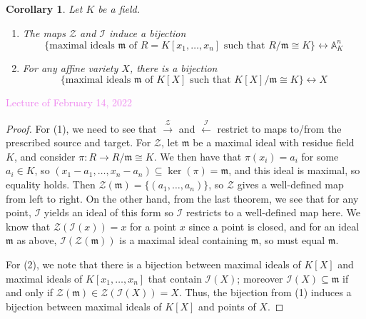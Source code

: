 \documentclass{amsart}[12pt]
\def\ker{\operatorname{ker}}
\newcommand{\Feb}[1]{\textcolor{violet}{Lecture of February #1, 2022}}
\newcommand{\A}{\mathbb{A}}
\newcommand{\cZ}{\mathcal{Z}}
\newcommand{\cI}{\mathcal{I}}
\newcommand{\fm}{{\mathfrak m}}
\numberwithin{equation}{section}
\theoremstyle{plain} %
\newtheorem{cor}[equation]{Corollary}
\theoremstyle{definition}
\theoremstyle{remark}
\newcommand{\xra}[1]{\xrightarrow{#1}}
\begin{document}
\begin{cor} Let $K$ be a field.
\begin{enumerate}
\item The maps $\cZ$ and $\cI$ induce a bijection \[ \{ \text{maximal ideals $\fm$ of $R=K[x_1,\dots,x_n]$ such that $R/\fm\cong K$} \} \leftrightarrow \A^n_K\]
\item For any affine variety $X$, there is a bijection
\[ \{ \text{maximal ideals $\fm$ of $K[X]$ such that $K[X]/\fm\cong K$} \} \leftrightarrow X\]
\end{enumerate}
\end{cor}




 \Feb{14}


 
 
\begin{proof}
For (1), we need to see that $\xra{\cZ}$ and $\xleftarrow{\cI}$ restrict to maps to/from the prescribed source and target. For $\cZ$, let $\fm$ be a maximal ideal with residue field $K$, and consider $\pi: R \to R/\fm \cong K$. We then have that $\pi(x_i) = a_i$ for some $a_i\in K$, so $(x_1-a_1,\dots,x_n-a_n) \subseteq \ker(\pi)=\fm$, and this ideal is maximal, so equality holds. Then $\cZ (\fm) = \{ (a_1,\dots,a_n)\}$, so $\cZ$ gives a well-defined map from left to right. On the other hand, from the last theorem, we see that for any point, $\cI$ yields an ideal of this form so $\cI$ restricts to a well-defined map here. We know that $\cZ(\cI(x))=x$ for a point $x$ since a point is closed, and for an ideal $\fm$ as above, $\cI(\cZ(\fm))$ is a maximal ideal containing $\fm$, so must equal $\fm$. 


For (2), we note that there is a bijection between maximal ideals of $K[X]$ and maximal ideals of $K[x_1,\dots,x_n]$ that contain $\cI(X)$; moreover $\cI(X) \subseteq \fm$ if and only if $\cZ(\fm) \in \cZ(\cI(X))=X$. Thus, the bijection from (1) induces a bijection between maximal ideals of $K[X]$ and points of $X$.
\end{proof}
\end{document}
